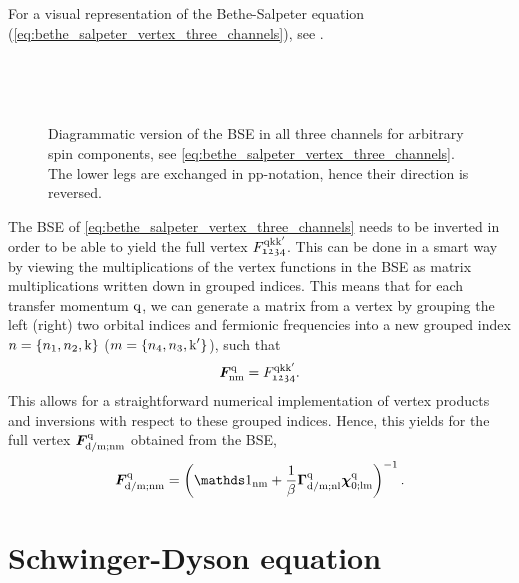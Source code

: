 \documentclass[../../main.tex]{subfiles}
\begin{document}
For a visual representation of the Bethe-Salpeter equation (\ref{eq:bethe_salpeter_vertex_three_channels}), see .
\begin{figure}[ht!]
  \centering
  \parbox{\textwidth}{
    \subfloat{}
  }\\[1cm]
  \parbox{\textwidth}{
    \subfloat{}
  }\\[1cm]
  \parbox{\textwidth}{
    \subfloat{}
  }
  \caption{Diagrammatic version of the BSE in all three channels for arbitrary spin components, see \eqref{eq:bethe_salpeter_vertex_three_channels}. The lower legs are exchanged in pp-notation, hence their direction is reversed.}
  \label{fig:bethe_salpeter_diagrammatic}
\end{figure}
The BSE of \eqref{eq:bethe_salpeter_vertex_three_channels} needs to be inverted in order to be able to yield the full vertex $F_{\mathfrak{1234}}^{\text{q}\text{k}\text{k}'}$. This can be done in a smart way by viewing the multiplications of the vertex functions in the BSE as matrix multiplications written down in grouped indices. This means that for each transfer momentum $\text{q}$, we can generate a matrix from a vertex by grouping the left (right) two orbital indices and fermionic frequencies into a new grouped index $n=\{n_1, n_2, \text{k}\}$ ($m=\{n_4, n_3, \text{k}'\}$), such that \cite{Galler2017} 
\begin{align}
	\bm{F}^{\text{q}}_{\text{nm}}=F^{\text{q}\text{k}\text{k}'}_{\mathfrak{1234}}.
\end{align}
This allows for a straightforward numerical implementation of vertex products and inversions with respect to these grouped indices. Hence, this yields for the full vertex $\bm{F}^{\text{q}}_{\text{d}/\text{m};\text{nm}}$ obtained from the BSE,
\begin{align}
	\bm{F}^{\q}_{\dens/\magn;\text{nm}}=\left (\unity_{\text{nm}} +\frac1\beta \bm{\Gamma}^{\q}_{\dens/\magn;\text{nl}}\bm{\chi}^{\q}_{0;\text{lm}}\right )^{-1}.
\end{align}

\section{Schwinger-Dyson equation}\label{sec:schwinger_dyson}
\end{document}
